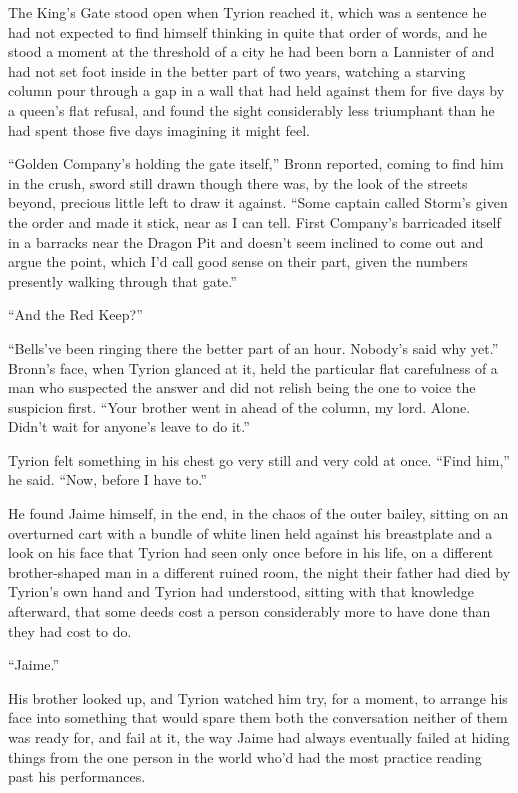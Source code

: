 The King’s Gate stood open when Tyrion reached it, which was a sentence he had not expected to find himself thinking in quite that order of words, and he stood a moment at the threshold of a city he had been born a Lannister of and had not set foot inside in the better part of two years, watching a starving column pour through a gap in a wall that had held against them for five days by a queen’s flat refusal, and found the sight considerably less triumphant than he had spent those five days imagining it might feel.

“Golden Company’s holding the gate itself,” Bronn reported, coming to find him in the crush, sword still drawn though there was, by the look of the streets beyond, precious little left to draw it against. “Some captain called Storm’s given the order and made it stick, near as I can tell. First Company’s barricaded itself in a barracks near the Dragon Pit and doesn’t seem inclined to come out and argue the point, which I’d call good sense on their part, given the numbers presently walking through that gate.”

“And the Red Keep?”

“Bells’ve been ringing there the better part of an hour. Nobody’s said why yet.” Bronn’s face, when Tyrion glanced at it, held the particular flat carefulness of a man who suspected the answer and did not relish being the one to voice the suspicion first. “Your brother went in ahead of the column, my lord. Alone. Didn’t wait for anyone’s leave to do it.”

Tyrion felt something in his chest go very still and very cold at once. “Find him,” he said. “Now, before I have to.”

\sceneBreak

He found Jaime himself, in the end, in the chaos of the outer bailey, sitting on an overturned cart with a bundle of white linen held against his breastplate and a look on his face that Tyrion had seen only once before in his life, on a different brother-shaped man in a different ruined room, the night their father had died by Tyrion’s own hand and Tyrion had understood, sitting with that knowledge afterward, that some deeds cost a person considerably more to have done than they had cost to do.

“Jaime.”

His brother looked up, and Tyrion watched him try, for a moment, to arrange his face into something that would spare them both the conversation neither of them was ready for, and fail at it, the way Jaime had always eventually failed at hiding things from the one person in the world who’d had the most practice reading past his performances.

